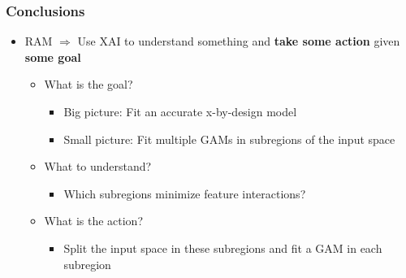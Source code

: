 \documentclass{beamer}
\begin{document}
\begin{frame}
  \frametitle{Conclusions}
  \begin{itemize}
  \item RAM $\Rightarrow$ Use XAI to understand something and \textbf{take some action} given \textbf{some goal}
    \begin{itemize}
    \item What is the goal?
      \begin{itemize}
      \item<2-> Big picture: Fit an accurate x-by-design model
      \item<2-> Small picture: Fit multiple GAMs in subregions of the input space
      \end{itemize}
    \item What to understand?
      \begin{itemize}
      \item<3-> Which subregions minimize feature interactions?
      \end{itemize}
    \item What is the action?
      \begin{itemize}
      \item<4-> Split the input space in these subregions and fit a GAM in each subregion
      \end{itemize}

      \end{itemize}
  \end{itemize}

  \noindent\makebox[\linewidth]{\rule{\paperwidth}{0.4pt}}

\end{frame}
\end{document}
